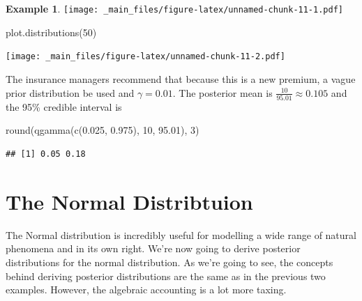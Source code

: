\documentclass[
]{book}
\newenvironment{Shaded}{\begin{snugshade}}{\end{snugshade}}
\newcommand{\DecValTok}[1]{\textcolor[rgb]{0.00,0.00,0.81}{#1}}
\newcommand{\FloatTok}[1]{\textcolor[rgb]{0.00,0.00,0.81}{#1}}
\newcommand{\FunctionTok}[1]{\textcolor[rgb]{0.00,0.00,0.00}{#1}}
\newcommand{\NormalTok}[1]{#1}
\theoremstyle{definition}
\theoremstyle{definition}
\newtheorem{example}{Example}[chapter]
\theoremstyle{definition}
\theoremstyle{definition}
\theoremstyle{remark}
\begin{document}
\begin{example}
\texttt{[image: \_main\_files/figure-latex/unnamed-chunk-11-1.pdf]}

\begin{Shaded}
\begin{Highlighting}[]
\FunctionTok{plot.distributions}\NormalTok{(}\DecValTok{50}\NormalTok{)}
\end{Highlighting}
\end{Shaded}

\texttt{[image: \_main\_files/figure-latex/unnamed-chunk-11-2.pdf]}

The insurance managers recommend that because this is a new premium, a vague prior distribution be used and \(\gamma = 0.01\). The posterior mean is \(\frac{10}{95.01} \approx 0.105\) and the 95\% credible interval is

\begin{Shaded}
\begin{Highlighting}[]
\FunctionTok{round}\NormalTok{(}\FunctionTok{qgamma}\NormalTok{(}\FunctionTok{c}\NormalTok{(}\FloatTok{0.025}\NormalTok{, }\FloatTok{0.975}\NormalTok{), }\DecValTok{10}\NormalTok{, }\FloatTok{95.01}\NormalTok{), }\DecValTok{3}\NormalTok{)}
\end{Highlighting}
\end{Shaded}

\begin{verbatim}
## [1] 0.05 0.18
\end{verbatim}

\end{example}

\hypertarget{the-normal-distribtuion}{%
\section{The Normal Distribtuion}\label{the-normal-distribtuion}}

The Normal distribution is incredibly useful for modelling a wide range of natural phenomena and in its own right. We're now going to derive posterior distributions for the normal distribution. As we're going to see, the concepts behind deriving posterior distributions are the same as in the previous two examples. However, the algebraic accounting is a lot more taxing.
\end{document}
